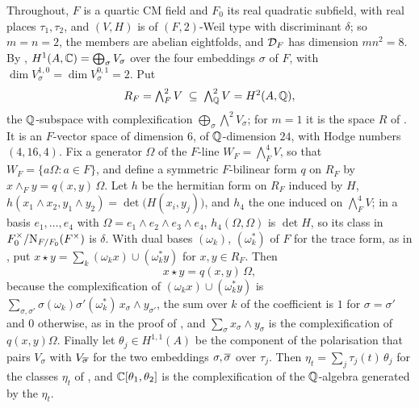Throughout, $F$ is a quartic CM field and $F_{0}$ its real quadratic subfield,
with real places $\tau_{1},\tau_{2}$, and $(V,H)$ is of $(F,2)$-Weil type with
discriminant $\delta$; so $m=n=2$, the members are abelian eightfolds, and
$\mathcal{D}_{F}$ has dimension $mn^{2}=8$. By \cite[Proposition~17.3(i)]{paperI},
$H^{1}(A,\mathbb{C})=\bigoplus_{\sigma}V_{\sigma}$ over the four embeddings $\sigma$ of
$F$, with $\dim V_{\sigma}^{1,0}=\dim V_{\sigma}^{0,1}=2$. Put
\[
  R_{F}=\textstyle\bigwedge^{2}_{F}V\;\subseteq\;\bigwedge^{2}_{\mathbb{Q}}V=H^{2}(A,\mathbb{Q}),
\]
the $\mathbb{Q}$-subspace with complexification
$\bigoplus_{\sigma}\bigwedge^{2}V_{\sigma}$; for $m=1$ it is the space $R$ of
\cite[Proposition~15.18]{paperI}. It is an $F$-vector space of dimension $6$, of
$\mathbb{Q}$-dimension $24$, with Hodge numbers $(4,16,4)$. Fix a generator $\Omega$
of the $F$-line $W_{F}=\bigwedge^{4}_{F}V$, so that
$W_{F}=\{a\Omega:a\in F\}$, and define a symmetric $F$-bilinear form $q$ on
$R_{F}$ by $x\wedge_{F}y=q(x,y)\,\Omega$. Let $h$ be the hermitian form on
$R_{F}$ induced by $H$, $h(x_{1}\wedge x_{2},y_{1}\wedge y_{2})
=\det\bigl(H(x_{i},y_{j})\bigr)$, and $h_{4}$ the one induced on
$\bigwedge^{4}_{F}V$; in a basis $e_{1},\dots,e_{4}$ with
$\Omega=e_{1}\wedge e_{2}\wedge e_{3}\wedge e_{4}$, $h_{4}(\Omega,\Omega)$ is
$\det H$, so its class in $F_{0}^{\times}/\mathrm{N}_{F/F_{0}}(F^{\times})$ is
$\delta$. With dual bases $(\omega_{k})$, $(\omega_{k}^{*})$ of $F$ for the
trace form, as in \cite[Theorem~17.5]{paperI}, put
$x\star y=\sum_{k}(\omega_{k}x)\cup(\omega_{k}^{*}y)$ for $x,y\in R_{F}$. Then
\begin{equation}\label{eq:quarticstar}
  x\star y=q(x,y)\,\Omega ,
\end{equation}
because the complexification of $(\omega_{k}x)\cup(\omega_{k}^{*}y)$ is
$\sum_{\sigma,\sigma'}\sigma(\omega_{k})\sigma'(\omega_{k}^{*})\,
x_{\sigma}\wedge y_{\sigma'}$, the sum over $k$ of the coefficient is $1$ for
$\sigma=\sigma'$ and $0$ otherwise, as in the proof of
\cite[Theorem~17.5(ii)]{paperI}, and $\sum_{\sigma}x_{\sigma}\wedge y_{\sigma}$ is
the complexification of $q(x,y)\Omega$. Finally let $\theta_{j}\in H^{1,1}(A)$
be the component of the polarisation that pairs $V_{\sigma}$ with
$V_{\overline{\sigma}}$ for the two embeddings $\sigma,\overline{\sigma}$ over $\tau_{j}$.
Then $\eta_{t}=\sum_{j}\tau_{j}(t)\,\theta_{j}$ for the classes $\eta_{t}$ of
\cite[Proposition~17.3(iii)]{paperI}, and $\mathbb{C}[\theta_{1},\theta_{2}]$ is the
complexification of the $\mathbb{Q}$-algebra generated by the $\eta_{t}$.

